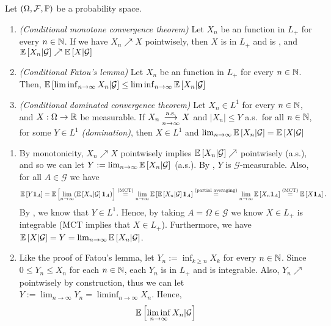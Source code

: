 \begin{enumerate}
Let \((\Omega,\mathcal{F},\mathbb{P})\) be a probability space.
\begin{enumerate}
\item \emph{(Conditional monotone convergence theorem)}
Let \(X_n\) be an  function in \(L_{+}\) for every \(n\in\mathbb{N}\).
If we have \(X_n\nearrow X\) pointwisely, then \(X\) is in \(L_{+}\) and
is , and \(\mathbb{E}\left[X_n|\mathcal{G}\right]\nearrow\mathbb{E}\left[X|\mathcal{G}\right]\) 
\item \emph{(Conditional Fatou's lemma)} Let \(X_n\) be an 
function in \(L_{+}\) for every \(n\in\mathbb{N}\). Then, \(\mathbb{E}\left[\liminf_{n\to
\infty}X_n|\mathcal{G}\right]\le\liminf_{n\to \infty}\mathbb{E}\left[X_n|\mathcal{G}\right]\)
\item \emph{(Conditional dominated convergence theorem)}
Let \(X_n\in L^{1}\) for every \(n\in\mathbb{N}\), and \(X:\Omega\to\mathbb{R}\) be measurable.
If \(X_n\underset{n\to\infty}{\overset{\text{a.s.}}{\longrightarrow}} X\) and \(|X_n|\le Y\) a.s.\ for all \(n\in\mathbb{N}\), for some
\(Y\in L^{1}\) \emph{(domination)}, then \(X\in L^{1}\) and
\(\lim_{n\to\infty}\mathbb{E}\left[X_n|\mathcal{G}\right]=\mathbb{E}\left[X|\mathcal{G}\right]\) 
\end{enumerate}
\begin{pf}
\begin{enumerate}
\item By monotonicity, \(X_n\nearrow X\) pointwisely implies
\(\mathbb{E}\left[X_n|\mathcal{G}\right]\nearrow\) pointwisely (a.s.), and so we can let
\(Y:=\lim_{n\to\infty}\mathbb{E}\left[X_n|\mathcal{G}\right]\) (a.s.). By
, \(Y\) is \(\mathcal{G}\)-measurable. Also, for all
\(A\in\mathcal{G}\) we have
\[
\mathbb{E}\left[Y\mathbf{1}_{A}\right]=\mathbb{E}\left[\lim_{n\to\infty}(\mathbb{E}\left[X_n|\mathcal{G}\right]\mathbf{1}_{A})\right]
\overset{\text{(MCT)}}{=}\lim_{n\to\infty}\mathbb{E}\left[\mathbb{E}\left[X_n|\mathcal{G}\right]\mathbf{1}_{A}\right]
\overset{\text{(partial averaging)}}{=}\lim_{n\to\infty}\mathbb{E}\left[X_n\mathbf{1}_{A}\right]
\overset{\text{(MCT)}}{=}\mathbb{E}\left[X\mathbf{1}_{A}\right].
\]
By , we know that \(Y\in L^{1}\). Hence, by taking
\(A=\Omega\in\mathcal{G}\) we know \(X\in L_{+}\) is integrable (MCT implies
that \(X\in L_{+}\)).  Furthermore, we have
\(\mathbb{E}\left[X|\mathcal{G}\right]=Y=\lim_{n\to\infty}\mathbb{E}\left[X_n|\mathcal{G}\right]\).
\item Like the proof of Fatou's lemma, let \(Y_n:=\inf_{k\ge n}X_k\) for every
\(n\in\mathbb{N}\). Since \(0\le Y_n\le X_n\) for each \(n\in\mathbb{N}\), each \(Y_n\) is in
\(L_{+}\) and is integrable. Also, \(Y_n\nearrow\) pointwisely by construction,
thus we can let \(Y:=\lim_{n\to\infty}Y_n=\liminf_{n\to \infty}X_n\).
Hence,
\begin{align*}
\expv{\liminf_{n\to \infty}X_n|\mathcal{G}}

\end{align*}
\end{enumerate}
\end{pf}
\end{enumerate}
